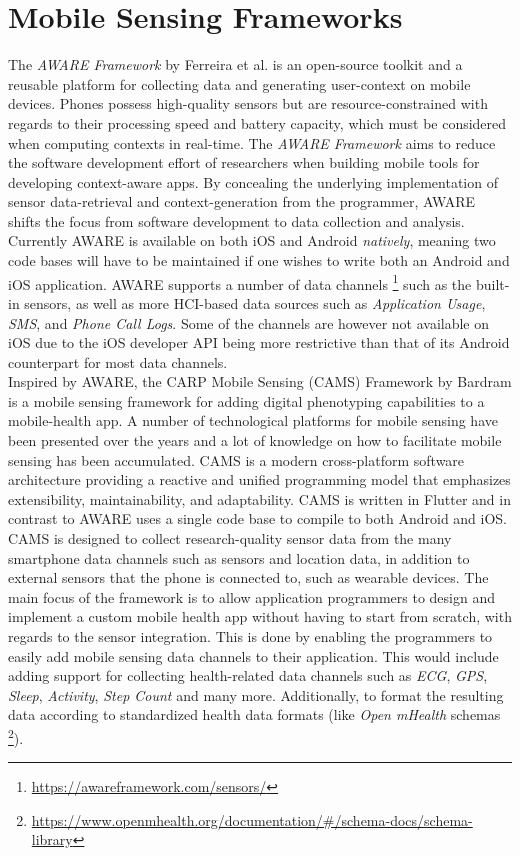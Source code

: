 \section{Mobile Sensing Frameworks}
The \textit{AWARE Framework} by Ferreira et al. \cite{aware2015} is an open-source toolkit and a reusable platform for collecting data and generating user-context on mobile devices. Phones possess high-quality sensors but are resource-constrained with regards to their processing speed and battery capacity, which must be considered when computing contexts in real-time. The \textit{AWARE Framework} aims to reduce the software development effort of researchers when building mobile tools for developing context-aware apps. By concealing the underlying implementation of sensor data-retrieval and context-generation from the programmer, AWARE shifts the focus from software development to data collection and analysis. Currently AWARE is available on both iOS and Android \textit{natively}, meaning two code bases will have to be maintained if one wishes to write both an Android and iOS application. AWARE supports a number of data channels \footnote{\url{https://awareframework.com/sensors/}} such as the built-in sensors, as well as more HCI-based data sources such as \textit{Application Usage}, \textit{SMS}, and \textit{Phone Call Logs}. Some of the channels are however not available on iOS due to the iOS developer API being more restrictive than that of its Android counterpart for most data channels.\\

Inspired by AWARE, the CARP Mobile Sensing (CAMS) Framework by Bardram \cite{CAMS} is a mobile sensing framework for adding digital phenotyping capabilities to a mobile-health app. A number of technological platforms for mobile sensing have been presented over the years and a lot of knowledge on how to facilitate mobile sensing has been accumulated. CAMS is a modern cross-platform software architecture providing a reactive and unified programming model that emphasizes extensibility, maintainability, and adaptability. CAMS is written in Flutter and in contrast to AWARE uses a single code base to compile to both Android and iOS.\\

CAMS is designed to collect research-quality sensor data from the many smartphone data channels such as sensors and location data, in addition to external sensors that the phone is connected to, such as wearable devices. The main focus of the framework is to allow application programmers to design and implement a custom mobile health app without having to start from scratch, with regards to the sensor integration. This is done by enabling the programmers to easily add mobile sensing data channels to their application. This would include adding support for collecting health-related data channels such as \textit{ECG}, \textit{GPS}, \textit{Sleep}, \textit{Activity}, \textit{Step Count} and many more. Additionally, to format the resulting data according to standardized health data formats (like \textit{Open mHealth} schemas \footnote{\url{https://www.openmhealth.org/documentation/#/schema-docs/schema-library}}). \\

